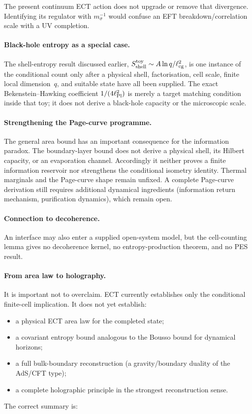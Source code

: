 \documentclass[11pt,a4paper]{article}
\begin{document}
The present continuum ECT action does not upgrade or remove that
divergence.  Identifying its regulator with $m_\sigma^{-1}$ would
confuse an EFT breakdown/correlation scale with a UV completion.

\paragraph{Black-hole entropy as a special case.}
The shell-entropy result discussed earlier,
$S_{\rm shell}^{\rm toy}\sim A\ln q/\ell_{\rm cg}^2$,
is one instance of the conditional count only after a physical shell,
factorisation, cell scale, finite local dimension~$q$, and suitable
state have all been supplied.
The exact Bekenstein--Hawking coefficient $1/(4\ell_{\rm Pl}^2)$
is merely a target matching condition inside that toy; it does not
derive a black-hole capacity or the microscopic scale.

\paragraph{Strengthening the Page-curve programme.}
The general area bound has an important consequence for the
information paradox.
The boundary-layer bound does not derive a physical shell, its Hilbert
capacity, or an evaporation channel.  Accordingly it neither proves a
finite information reservoir nor strengthens the conditional isometry
identity.  Thermal marginals and the Page-curve shape remain unfixed.
A complete Page-curve derivation still requires additional
dynamical ingredients (information return mechanism, purification
dynamics), which remain open.

\paragraph{Connection to decoherence.}
An interface may also enter a supplied open-system model, but the
cell-counting lemma gives no decoherence kernel, no entropy-production
theorem, and no PES result.

\paragraph{From area law to holography.}
It is important not to overclaim.
ECT currently establishes only the conditional finite-cell implication.
It does not yet establish:
\begin{itemize}[nosep]
  \item a physical ECT area law for the completed state;
  \item a covariant entropy bound analogous to the Bousso bound
    for dynamical horizons;
  \item a full bulk-boundary reconstruction (a gravity/boundary
    duality of the AdS/CFT type);
  \item a complete holographic principle in the strongest
    reconstruction sense.
\end{itemize}
The correct summary is:
\end{document}
